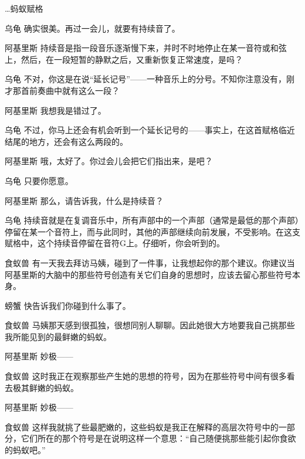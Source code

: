 \begin{dialog}{…蚂蚁赋格}
\begin{dialogue}
\item[乌龟]确实很美。再过一会儿，就要有持续音了。

\item[阿基里斯]持续音是指一段音乐逐渐慢下来，并时不时地停止在某一音符或和弦上，然后，在一段短暂的静默之后，又重新恢复正常速度，是吗？

\item[乌龟]不对，你这是在说“延长记号”——一种音乐上的分号。不知你注意没有，刚才那首前奏曲中就有这么一段？

\item[阿基里斯]我想我是错过了。

\item[乌龟]不过，你马上还会有机会听到一个延长记号的——事实上，在这首赋格临近结尾的地方，还会有这么两段的。

\item[阿基里斯]哦，太好了。你过会儿会把它们指出来，是吧？

\item[乌龟]只要你愿意。

\item[阿基里斯]那么，请告诉我，什么是持续音？

\item[乌龟]持续音就是在复调音乐中，所有声部中的一个声部（通常是最低的那个声部）停留在某一个音符上，而与此同时，其他的声部继续向前发展，不受影响。在这支赋格中，这个持续音停留在音符G上。仔细听，你会听到的。

\item[食蚁兽]有一天我去拜访马姨，碰到了一件事，让我想起你的那个建议。你建议当阿基里斯的大脑中的那些符号创造有关它们自身的思想时，应该去留心那些符号本身。

\item[螃蟹]快告诉我们你碰到什么事了。

\item[食蚁兽]马姨那天感到很孤独，很想同别人聊聊。因此她很大方地要我自己挑那些我所能见到的最鲜嫩的蚂蚁。

\item[阿基里斯]妙极——

\item[食蚁兽]这时我正在观察那些产生她的思想的符号，因为在那些符号中间有很多看去极其鲜嫩的蚂蚁。

\item[阿基里斯]妙极——

\item[食蚁兽]这样我就挑了些最肥嫩的，这些蚂蚁是我正在解释的高层次符号中的一部分，它们所在的那个符号是在说明这样一个意思：“自己随便挑那些能引起你食欲的蚂蚁吧。”


\end{dialogue}
\end{dialog}
